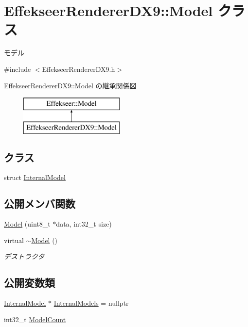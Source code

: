 \hypertarget{class_effekseer_renderer_d_x9_1_1_model}{}\section{Effekseer\+Renderer\+D\+X9\+:\+:Model クラス}
\label{class_effekseer_renderer_d_x9_1_1_model}


モデル  




{\ttfamily \#include $<$Effekseer\+Renderer\+D\+X9.\+h$>$}

Effekseer\+Renderer\+D\+X9\+:\+:Model の継承関係図\begin{figure}[H]
\begin{center}
\leavevmode
\includegraphics[height=2.000000cm]{class_effekseer_renderer_d_x9_1_1_model}
\end{center}
\end{figure}
\subsection*{クラス}
\begin{DoxyCompactItemize}
\item 
struct \mbox{\hyperlink{struct_effekseer_renderer_d_x9_1_1_model_1_1_internal_model}{Internal\+Model}}
\end{DoxyCompactItemize}
\subsection*{公開メンバ関数}
\begin{DoxyCompactItemize}
\item 
\mbox{\hyperlink{class_effekseer_renderer_d_x9_1_1_model_a2cc666c9789232bbe6bb09e5cf3fad6a}{Model}} (uint8\+\_\+t $\ast$data, int32\+\_\+t size)
\item 
virtual \mbox{\hyperlink{class_effekseer_renderer_d_x9_1_1_model_a5878dbe0a5971ffb28d6c1af347c6e87}{$\sim$\+Model}} ()
\begin{DoxyCompactList}\small\item\em デストラクタ \end{DoxyCompactList}\end{DoxyCompactItemize}
\subsection*{公開変数類}
\begin{DoxyCompactItemize}
\item 
\mbox{\hyperlink{struct_effekseer_renderer_d_x9_1_1_model_1_1_internal_model}{Internal\+Model}} $\ast$ \mbox{\hyperlink{class_effekseer_renderer_d_x9_1_1_model_a712d95cfe8c2223a708038c7132e60f5}{Internal\+Models}} = nullptr
\item 
int32\+\_\+t \mbox{\hyperlink{class_effekseer_renderer_d_x9_1_1_model_a993f041558265db631654723ca973e0a}{Model\+Count}}
\end{DoxyCompactItemize}
